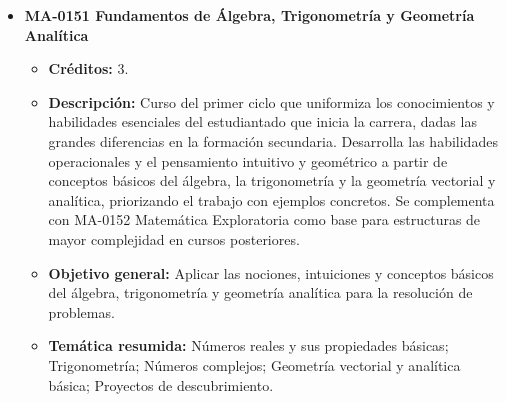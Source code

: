 
\begingroup
\small
\begin{itemize}[leftmargin=1.3em, itemsep=10pt, topsep=4pt, label={\color{Azul-UCR}$\blacksquare$}]
\item {\color{Azul-UCR}\textbf{MA-0151 Fundamentos de Álgebra, Trigonometría y Geometría Analítica}}\par\nopagebreak\smallskip
\begin{itemize}[leftmargin=1.1em, itemsep=3pt, topsep=2pt, parsep=2pt, label={\textendash}]
\item \textbf{Créditos:} 3.
\item \textbf{Descripción:} Curso del primer ciclo que uniformiza los conocimientos y habilidades esenciales del estudiantado que inicia la carrera, dadas las grandes diferencias en la formación secundaria. Desarrolla las habilidades operacionales y el pensamiento intuitivo y geométrico a partir de conceptos básicos del álgebra, la trigonometría y la geometría vectorial y analítica, priorizando el trabajo con ejemplos concretos. Se complementa con MA-0152 Matemática Exploratoria como base para estructuras de mayor complejidad en cursos posteriores.
\item \textbf{Objetivo general:} Aplicar las nociones, intuiciones y conceptos básicos del álgebra, trigonometría y geometría analítica para la resolución de problemas.
\item \textbf{Temática resumida:} Números reales y sus propiedades básicas; Trigonometría; Números complejos; Geometría vectorial y analítica básica; Proyectos de descubrimiento.
\end{itemize}


\end{itemize}
